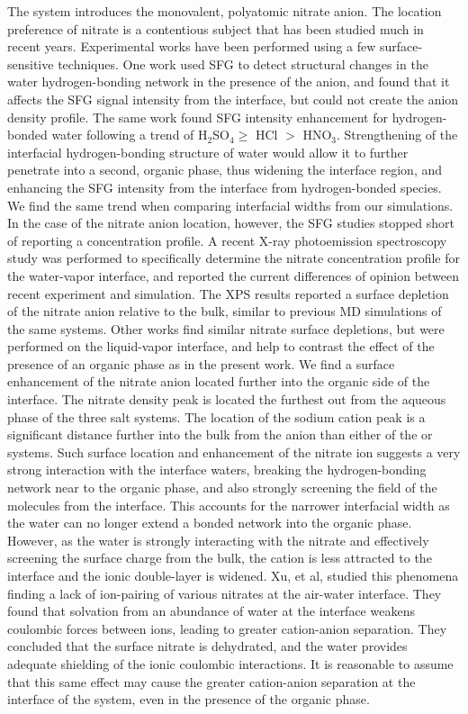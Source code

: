 The \sodnit system introduces the monovalent, polyatomic nitrate anion. The location preference of nitrate is a contentious subject that has been studied much in recent years. Experimental works have been performed using a few surface-sensitive techniques. One work used SFG to detect structural changes in the water hydrogen-bonding network in the presence of the anion, and found that it affects the SFG signal intensity from the interface, but could not create the anion density profile\cite{Schnitzer2000}. The same work found SFG intensity enhancement for hydrogen-bonded water following a trend of H$_2$SO$_4\ge$ HCl $>$ HNO$_3$. Strengthening of the interfacial hydrogen-bonding structure of water would allow it to further penetrate into a second, organic phase, thus widening the interface region, and enhancing the SFG intensity from the interface from hydrogen-bonded species. We find the same trend when comparing interfacial widths from our simulations. In the case of the nitrate anion location, however, the SFG studies stopped short of reporting a concentration profile. A recent X-ray photoemission spectroscopy study was performed to specifically determine the nitrate concentration profile for the water-vapor interface, and reported the current differences of opinion between recent experiment and simulation.\cite{Brown2009} The XPS results reported a surface depletion of the nitrate anion relative to the bulk, similar to previous MD simulations of the same systems. Other works find similar nitrate surface depletions,\cite{Otten2007} but were performed on the liquid-vapor interface, and help to contrast the effect of the presence of an organic phase as in the present work. We find a surface enhancement of the nitrate anion located further into the organic side of the interface. The nitrate density peak is located the furthest out from the aqueous phase of the three salt systems. The location of the sodium cation peak is a significant distance further into the bulk from the anion than either of the \nacl or \sodsul systems. Such surface location and enhancement of the nitrate ion suggests a very strong interaction with the interface waters, breaking the hydrogen-bonding network near to the organic phase, and also strongly screening the field of the \ctc molecules from the interface. This accounts for the narrower interfacial width as the water can no longer extend a bonded network into the organic phase. However, as the water is strongly interacting with the nitrate and effectively screening the surface charge from the bulk, the cation is less attracted to the interface and the ionic double-layer is widened. Xu, et al, studied this phenomena finding a lack of ion-pairing of various nitrates at the air-water interface.\cite{Xu2009} They found that solvation from an abundance of water at the interface weakens coulombic forces between ions, leading to greater cation-anion separation. They concluded that the surface nitrate is dehydrated, and the water provides adequate shielding of the ionic coulombic interactions. It is reasonable to assume that this same effect may cause the greater cation-anion separation at the interface of the \sodnit system, even in the presence of the organic phase.

